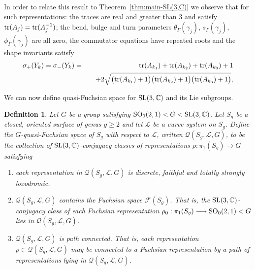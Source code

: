 \documentclass[11pt]{amsart}
\newtheorem{definition}[theorem]{Definition}
\numberwithin{equation}{section}
\begin{document}
In order to relate this result to Theorem~\ref{thm:main-SL(3,C)} we observe that for such representations:
the traces are real and greater than $3$ and satisfy ${\rm tr}(A_j)={\rm tr}(A_j^{-1})$; the 
bend, bulge and turn parameters $\theta_\Gamma(\gamma_j)$, $s_\Gamma(\gamma_j)$, $\phi_\Gamma(\gamma_j)$
are all zero, the commutator equations have repeated roots and the shape invariants satisfy
\begin{eqnarray}
\sigma_+(Y_k) = \sigma_-(Y_k)  & = & {\rm tr}(A_{k_1})+{\rm tr}(A_{k_2})+{\rm tr}(A_{k_3})+1 \label{eq:shape-SL} \\
&& \quad +2\sqrt{\bigl({\rm tr}(A_{k_1})+1\bigr)\bigl({\rm tr}(A_{k_2})+1\bigr)\bigl({\rm tr}(A_{k_3})+1\bigr)}, \notag
\end{eqnarray}

We can now define quasi-Fuchsian space for ${\rm SL}(3,{\mathbb C})$ and its Lie subgroups.

\begin{definition}
Let $G$ be a group satisfying ${\rm SO}_0(2,1)<G<{\rm SL}(3,{\mathbb C})$. Let $S_g$ be a closed, oriented
surface of genus $g\ge 2$ and let ${\mathcal L}$ be a curve system on $S_g$. Define 
the $G$-quasi-Fuchsian space of $S_g$ with respect to ${\mathcal L}$, written ${\mathcal Q}(S_g,{\mathcal L},G)$, 
to be the collection of ${\rm SL}(3,{\mathbb C})$-conjugacy 
classes of representations $\rho:\pi_1(S_g)\longrightarrow G$ satisfying
\begin{enumerate}
\item[(1)] each representation in ${\mathcal Q}(S_g,{\mathcal L},G)$ is discrete, faithful and totally strongly loxodromic.
\item[(2)] ${\mathcal Q}(S_g,{\mathcal L},G)$ contains the Fuchsian space ${\mathcal F}(S_g)$. That is, 
the ${\rm SL}(3,{\mathbb C})$-conjugacy class of each Fuchsian representation 
$\rho_0:\pi_1(S_g)\longrightarrow {\rm SO}_0(2,1)<G$ lies in ${\mathcal Q}(S_g,{\mathcal L},G)$. 
\item[(3)] ${\mathcal Q}(S_g,{\mathcal L},G)$ is path connected. That is, each 
representation $\rho\in {\mathcal Q}(S_g,{\mathcal L},G)$ may be connected to a Fuchsian representation
by a path of representations lying in ${\mathcal Q}(S_g,{\mathcal L},G)$.
\end{enumerate}
\end{definition}
%
%
%
\end{document}
